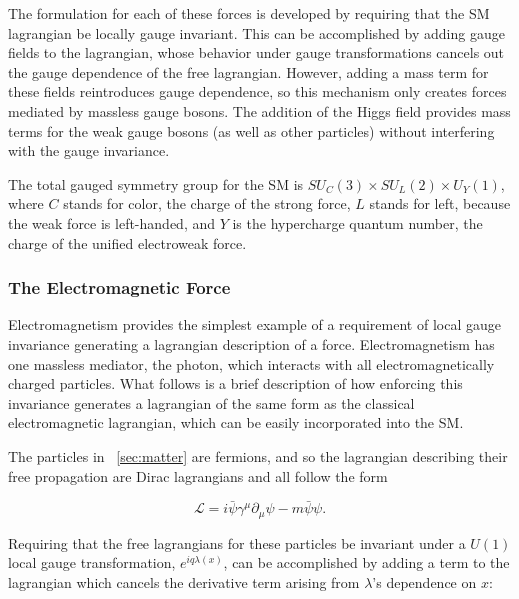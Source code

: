 The formulation for each of these forces is developed by requiring that the \ac{SM} lagrangian be locally gauge invariant. \cite{Griffiths:111880} This can be accomplished by adding gauge fields to the lagrangian, whose behavior under gauge transformations cancels out the gauge dependence of the free lagrangian. However, adding a mass term for these fields reintroduces gauge dependence, so this mechanism only creates forces mediated by massless gauge bosons. The addition of the Higgs field provides mass terms for the weak gauge bosons (as well as other particles) without interfering with the gauge invariance. 

The total gauged symmetry group for the \ac{SM} is $SU_C(3) \times SU_L(2) \times U_Y(1)$, where $C$ stands for color, the charge of the strong force, $L$ stands for left, because the weak force is left-handed, and $Y$ is the hypercharge quantum number, the charge of the unified electroweak force. 



\subsubsection{The Electromagnetic Force}
\label{sec:em}

Electromagnetism provides the simplest example of a requirement of local gauge invariance generating a lagrangian description of a force.
Electromagnetism has one massless mediator, the photon, which interacts with all electromagnetically charged particles. What follows is a brief description of how enforcing this invariance generates a lagrangian of the same form as the classical electromagnetic lagrangian, which can be easily incorporated into the \ac{SM}. 

The particles in ~\autoref{sec:matter} are fermions, and so the lagrangian describing their free propagation are Dirac lagrangians and all follow the form

\begin{equation}
\mathcal{L} = i\bar{\psi}\gamma^\mu \partial_\mu\psi - m \bar{\psi}\psi . 
\end{equation}

Requiring that the free lagrangians for these particles be invariant under a $U(1)$ local gauge transformation, $e^{iq\lambda(x)}$, can be accomplished by adding a term to the lagrangian which cancels the derivative term arising from $\lambda$'s dependence on $x$: 

